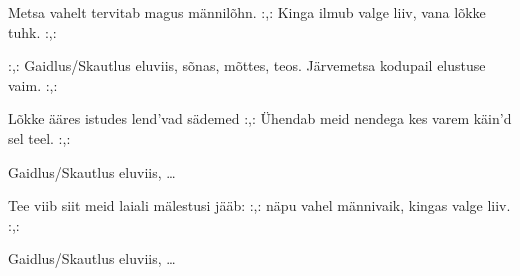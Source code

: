 Metsa vahelt tervitab
magus m\"annil\~ohn.
:,: Kinga ilmub valge liiv,
vana l\~okke tuhk. :,:

:,: Gaidlus/Skautlus eluviis,
s\~onas, m\~ottes, teos.
J\"arvemetsa kodupail
elustuse vaim. :,:

L\~okke \"a\"ares istudes
lend'vad s\"ademed
:,: \"Uhendab meid nendega
kes varem k\"ain'd sel teel. :,:

Gaidlus/Skautlus eluviis, \ldots

Tee viib siit meid laiali
m\"alestusi j\"a\"ab: 
:,: n\"apu vahel m\"annivaik,
kingas valge liiv. :,:

Gaidlus/Skautlus eluviis, \ldots